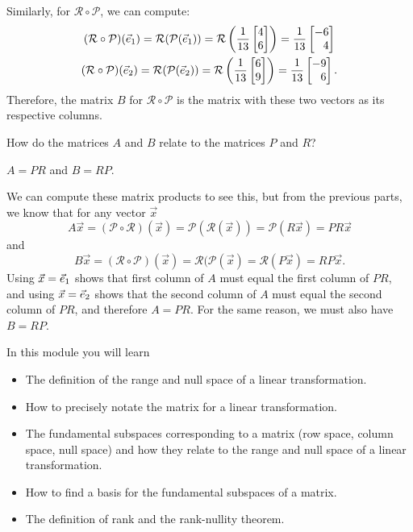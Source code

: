 \documentclass{workbook}
\begin{document}
\begin{slide}
\begin{parts}
\begin{solution}
				Similarly, for $\mathcal R\circ \mathcal P$, we can compute:
				\begin{gather*}
					(\mathcal R\circ\mathcal P)(\xhat)
					=\mathcal R(\mathcal P(\xhat))
					=\mathcal R\left(\frac{1}{13}\mat{4\\6}\right)
					=\frac{1}{13}\mat{-6\\4} \\
					(\mathcal R\circ\mathcal P)(\yhat)
					=\mathcal R(\mathcal P(\yhat))
					=\mathcal R\left(\frac{1}{13}\mat{6\\9}\right)
					=\frac{1}{13}\mat{-9\\6}.
				\end{gather*}
				Therefore, the matrix $B$ for $\mathcal R\circ\mathcal P$ is the
				matrix with these two vectors as its respective columns.
			\end{solution}
		\item How do the matrices $A$ and $B$ relate to the matrices $P$ and $R$?
			\begin{solution}
				$A = PR$ and $B = RP$.

				We can compute these matrix products to see this, but
				from the previous parts, we know that for any vector $\vec x$
				\[
					A\vec x
					=(\mathcal P\circ\mathcal R)(\vec x)
					=\mathcal P(\mathcal R(\vec x))
					=\mathcal P(R\vec x)
					=PR\vec x
				\]
				and
				\[
					B\vec x
					=(\mathcal R\circ\mathcal P)(\vec x)
					=\mathcal R(\mathcal P(\vec x)
					=\mathcal R(P\vec x)
					=RP\vec x.
				\]
				Using $\vec x = {\vec e_1}$ shows that first column of $A$ must equal
				the first column of $PR$, and using $\vec x = {\vec e_2}$ shows that
				the second column of $A$ must equal the second column of $PR$,
				and therefore $A = PR$. For the same reason, we must also have $B=RP$.
			\end{solution}

	\end{parts}
\end{slide}

\begin{module}

	In this module you will learn
	\begin{itemize}
		\item The definition of the range and null space of a linear transformation.
		\item How to precisely notate the matrix for a linear transformation.
		\item The fundamental subspaces corresponding to a matrix (row space, column space,
			null space) and how they relate to the range and null space of a linear transformation.
		\item How to find a basis for the fundamental subspaces of a matrix.
		\item The definition of rank and the rank-nullity theorem.
	\end{itemize}

	
	
\end{module}
\end{document}
